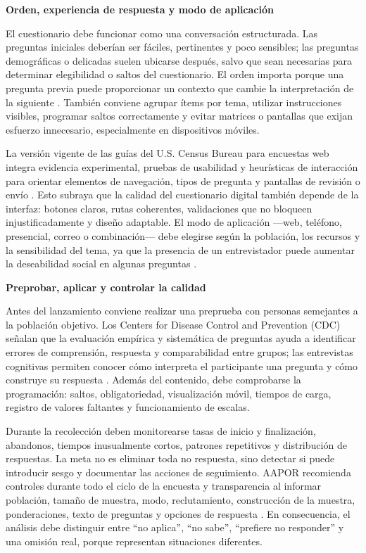\documentclass[12pt,letterpaper]{article}
\begin{document}
\textbf{Orden, experiencia de respuesta y modo de aplicación}\par
El cuestionario debe funcionar como una conversación estructurada. Las preguntas iniciales deberían ser fáciles, pertinentes y poco sensibles; las preguntas demográficas o delicadas suelen ubicarse después, salvo que sean necesarias para determinar elegibilidad o saltos del cuestionario. El orden importa porque una pregunta previa puede proporcionar un contexto que cambie la interpretación de la siguiente \parencite{pew_questions}. También conviene agrupar ítems por tema, utilizar instrucciones visibles, programar saltos correctamente y evitar matrices o pantallas que exijan esfuerzo innecesario, especialmente en dispositivos móviles.

La versión vigente de las guías del U.S. Census Bureau para encuestas web integra evidencia experimental, pruebas de usabilidad y heurísticas de interacción para orientar elementos de navegación, tipos de pregunta y pantallas de revisión o envío \parencite{census_guidelines}. Esto subraya que la calidad del cuestionario digital también depende de la interfaz: botones claros, rutas coherentes, validaciones que no bloqueen injustificadamente y diseño adaptable. El modo de aplicación ---web, teléfono, presencial, correo o combinación--- debe elegirse según la población, los recursos y la sensibilidad del tema, ya que la presencia de un entrevistador puede aumentar la deseabilidad social en algunas preguntas \parencite{pew_questions}.

\textbf{Preprobar, aplicar y controlar la calidad}\par
Antes del lanzamiento conviene realizar una preprueba con personas semejantes a la población objetivo. Los Centers for Disease Control and Prevention (CDC) señalan que la evaluación empírica y sistemática de preguntas ayuda a identificar errores de comprensión, respuesta y comparabilidad entre grupos; las entrevistas cognitivas permiten conocer cómo interpreta el participante una pregunta y cómo construye su respuesta \parencite{cdc_question_eval}. Además del contenido, debe comprobarse la programación: saltos, obligatoriedad, visualización móvil, tiempos de carga, registro de valores faltantes y funcionamiento de escalas.

Durante la recolección deben monitorearse tasas de inicio y finalización, abandonos, tiempos inusualmente cortos, patrones repetitivos y distribución de respuestas. La meta no es eliminar toda no respuesta, sino detectar si puede introducir sesgo y documentar las acciones de seguimiento. AAPOR recomienda controles durante todo el ciclo de la encuesta y transparencia al informar población, tamaño de muestra, modo, reclutamiento, construcción de la muestra, ponderaciones, texto de preguntas y opciones de respuesta \parencite{aapor_best}. En consecuencia, el análisis debe distinguir entre ``no aplica'', ``no sabe'', ``prefiere no responder'' y una omisión real, porque representan situaciones diferentes.
\end{document}
